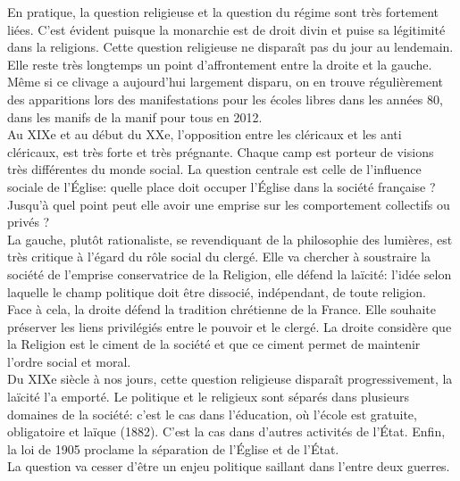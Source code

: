 \documentclass[10pt, a4paper, openany]{book}
\begin{document}
En pratique, la question religieuse et la question du régime sont très fortement liées. C'est évident puisque la monarchie est de droit divin et puise sa légitimité dans la religions. Cette question religieuse ne disparaît pas du jour au lendemain. Elle reste très longtemps un point d'affrontement entre la droite et la gauche. Même si ce clivage a aujourd'hui largement disparu, on en trouve régulièrement des apparitions lors des manifestations pour les écoles libres dans les années 80, dans les manifs de la manif pour tous en 2012. \\
Au XIXe et au début du XXe, l'opposition entre les cléricaux et les anti cléricaux, est très forte et très prégnante. Chaque camp est porteur de visions très différentes du monde social. La question centrale est celle de l'influence sociale de l'Église: quelle place doit occuper l'Église dans la société française ? Jusqu'à quel point peut elle avoir une emprise sur les comportement collectifs ou privés ? \\
La gauche, plutôt rationaliste, se revendiquant de la philosophie des lumières, est très critique à l'égard du rôle social du clergé. Elle va chercher à soustraire la société de l'emprise conservatrice de la Religion, elle défend la laïcité: l'idée selon laquelle le champ politique doit être dissocié, indépendant, de toute religion. \\
Face à cela, la droite défend la tradition chrétienne de la France. Elle souhaite préserver les liens privilégiés entre le pouvoir et le clergé. La droite considère que la Religion est le ciment de la société et que ce ciment permet de maintenir l'ordre social et moral. \\
Du XIXe siècle à nos jours, cette question religieuse disparaît progressivement, la laïcité l'a emporté. Le politique et le religieux sont séparés dans plusieurs domaines de la société: c'est le cas dans l'éducation, où l'école est gratuite, obligatoire et laïque (1882). C'est la cas dans d'autres activités de l'État. Enfin, la loi de 1905 proclame la séparation de l'Église et de l'État. \\
La question va cesser d'être un enjeu politique saillant dans l'entre deux guerres.
\end{document}
